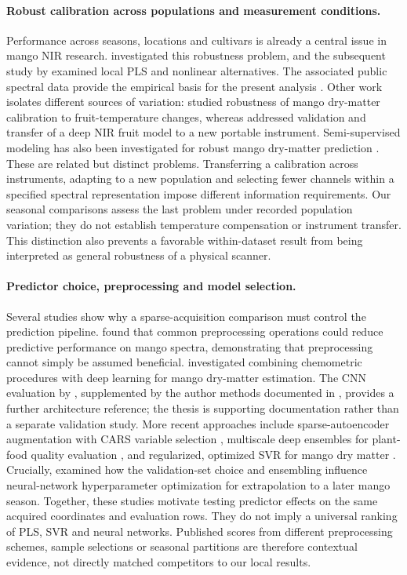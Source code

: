 \documentclass[11pt,a4paper]{article}
\begin{document}
\paragraph{Robust calibration across populations and measurement conditions.}
Performance across seasons, locations and cultivars is already a central issue in mango NIR research. \citet{anderson2020} investigated this robustness problem, and the subsequent study by \citet{anderson2021local} examined local PLS and nonlinear alternatives. The associated public spectral data provide the empirical basis for the present analysis \citep{andersondata2024}. Other work isolates different sources of variation: \citet{sun2020temperature} studied robustness of mango dry-matter calibration to fruit-temperature changes, whereas \citet{mishra2021transfer} addressed validation and transfer of a deep NIR fruit model to a new portable instrument. Semi-supervised modeling has also been investigated for robust mango dry-matter prediction \citep{mishra2023}. These are related but distinct problems. Transferring a calibration across instruments, adapting to a new population and selecting fewer channels within a specified spectral representation impose different information requirements. Our seasonal comparisons assess the last problem under recorded population variation; they do not establish temperature compensation or instrument transfer. This distinction also prevents a favorable within-dataset result from being interpreted as general robustness of a physical scanner.

\paragraph{Predictor choice, preprocessing and model selection.}
Several studies show why a sparse-acquisition comparison must control the prediction pipeline. \citet{mishra2021preprocessing} found that common preprocessing operations could reduce predictive performance on mango spectra, demonstrating that preprocessing cannot simply be assumed beneficial. \citet{mishra2021synergy} investigated combining chemometric procedures with deep learning for mango dry-matter estimation. The CNN evaluation by \citet{walsh2024}, supplemented by the author methods documented in \citet{walshthesis2024}, provides a further architecture reference; the thesis is supporting documentation rather than a separate validation study. More recent approaches include sparse-autoencoder augmentation with CARS variable selection \citep{yang2025}, multiscale deep ensembles for plant-food quality evaluation \citep{yang2026}, and regularized, optimized SVR for mango dry matter \citep{ma2026}. Crucially, \citet{dirks2022} examined how the validation-set choice and ensembling influence neural-network hyperparameter optimization for extrapolation to a later mango season. Together, these studies motivate testing predictor effects on the same acquired coordinates and evaluation rows. They do not imply a universal ranking of PLS, SVR and neural networks. Published scores from different preprocessing schemes, sample selections or seasonal partitions are therefore contextual evidence, not directly matched competitors to our local results.
\end{document}

